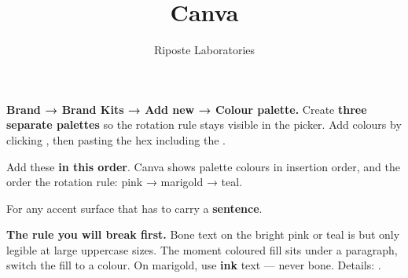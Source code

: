 \documentclass[fontpath=fonts/,logopath=logo/]{riposte-doc}
\title{Canva}
\author{Riposte Laboratories}
\date{}
\begin{document}
\ripmakehead

\riptoc



\textbf{Brand → Brand Kits → Add new → Colour palette.} Create \textbf{three separate palettes} so the rotation rule stays visible in the picker. Add colours by clicking \ripmono{+}, then pasting the hex including the \ripmono{\#}.



\ripcodeopen
{}
\ripcodesizereset\ripcodeclose



Add these \textbf{in this order}. Canva shows palette colours in insertion order, and the order  the rotation rule: pink → marigold → teal.

\ripcodeopen
{}
\ripcodesizereset\ripcodeclose



For any accent surface that has to carry a \textbf{sentence}.

\ripcodeopen
{}
\ripcodesizereset\ripcodeclose

\begin{ripnote}
\textbf{The rule you will break first.} Bone text on the bright pink or teal is  but only legible at large uppercase sizes. The moment coloured fill sits under a paragraph, switch the fill to a  colour. On marigold, use \textbf{ink}  text — never bone. Details: .
\end{ripnote}


\end{document}
